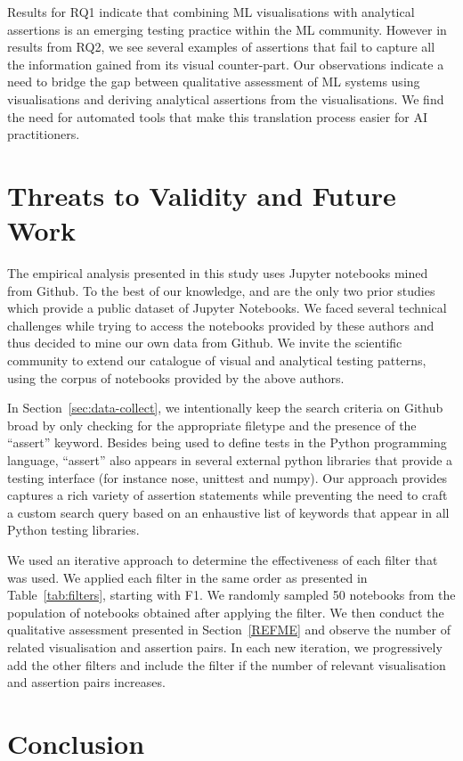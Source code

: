\documentclass[conference]{IEEEtran}
\begin{document}
Results for RQ1 indicate that combining ML visualisations with analytical assertions is an emerging testing practice within the ML community. However in results from RQ2, we see several examples of assertions that fail to capture all the information gained from its visual counter-part. Our observations indicate a need to bridge the gap between qualitative assessment of ML systems using visualisations and deriving analytical assertions from the visualisations. We find the need for automated tools that make this translation process easier for AI practitioners.

\section{Threats to Validity and Future Work}\label{sec:threats}
%
The empirical analysis presented in this study uses Jupyter notebooks mined from Github. To the best of our knowledge, \cite{pimentel2019large} and \cite{quaranta2021kgtorrent} are the only two prior studies which provide a public dataset of Jupyter Notebooks. We faced several technical challenges while trying to access the notebooks provided by these authors and thus decided to mine our own data from Github. We invite the scientific community to extend our catalogue of visual and analytical testing patterns, using the corpus of notebooks provided by the above authors.

In Section~\ref{sec:data-collect}, we intentionally keep the search criteria on Github broad by only checking for the appropriate filetype and the presence of the ``assert'' keyword. Besides being used to define tests in the Python programming language, ``assert'' also appears in several external python libraries that provide a testing interface (for instance nose, unittest and numpy). Our approach provides captures a rich variety of assertion statements while preventing the need to craft a custom search query based on an enhaustive list of keywords that appear in all Python testing libraries.

We used an iterative approach to determine the effectiveness of each filter that was used. We applied each filter in the same order as presented in Table~\ref{tab:filters}, starting with F1. We randomly sampled 50 notebooks from the population of notebooks obtained after applying the filter. We then conduct the qualitative assessment presented in Section~\ref{REFME} and observe the number of related visualisation and assertion pairs. In each new iteration, we progressively add the other filters and include the filter if the number of relevant visualisation and assertion pairs increases.


\section{Conclusion}\label{sec:conclude}



\end{document}
